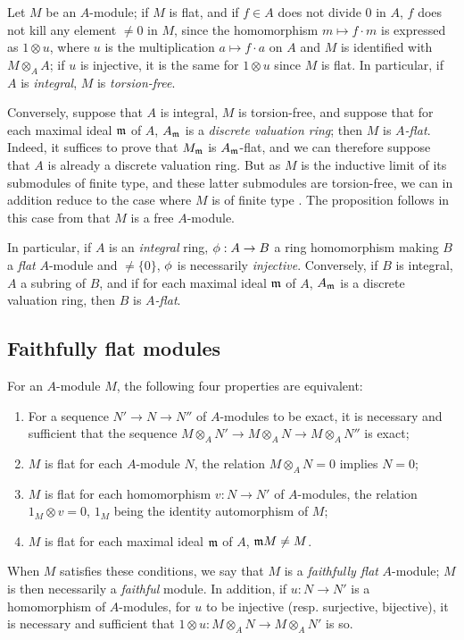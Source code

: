 \begin{env}[6.3.4]
\label{0.6.3.4}
Let $M$ be an $A$-module; if $M$ is flat, and if $f\in A$ does not divide $0$ in $A$, $f$
does not kill any element $\neq 0$ in $M$, since the homomorphism $m\mapsto f\cdot m$ is
expressed as $1\otimes u$, where $u$ is the multiplication $a\mapsto f\cdot a$ on $A$ and
$M$ is identified with $M\otimes_A A$; if $u$ is injective, it is the same for $1\otimes u$
since $M$ is flat. In particular, if $A$ is {\em integral}, $M$ is {\em torsion-free}.

Conversely, suppose that $A$ is integral, $M$ is torsion-free, and suppose that for each
maximal ideal $\mathfrak{m}$ of $A$, $A_\mathfrak{m}$ is a {\em discrete valuation ring};
then $M$ is {\em $A$-flat}. Indeed, it suffices  to prove that
$M_\mathfrak{m}$ is $A_\mathfrak{m}$-flat, and we can therefore suppose that $A$ is already
a discrete valuation ring. But as $M$ is the inductive limit of its submodules of finite
type, and these latter submodules are torsion-free, we can in addition reduce to the case
where $M$ is of finite type . The proposition follows in this
case from that $M$ is a free $A$-module.

In particular, if $A$ is an {\em integral} ring, $\phi:A\to B$ a ring homomorphism making
$B$ a {\em flat} $A$-module and $\neq\{0\}$, $\phi$ is necessarily {\em injective}.
Conversely, if $B$ is integral, $A$ a subring of $B$, and if for each maximal ideal
$\mathfrak{m}$ of $A$, $A_\mathfrak{m}$ is a discrete valuation ring, then $B$ is
{\em $A$-flat}.
\end{env}

\subsection{Faithfully flat modules}
\label{subsection-faithfully-flat-modules}

\begin{env}[6.4.1]
\label{0.6.4.1}
For an $A$-module $M$, the following four properties are equivalent:
\begin{enumerate}[label=(\alph*)]
  \item For a sequence $N'\to N\to N''$ of $A$-modules to be exact, it is necessary and
    sufficient that the sequence $M\otimes_A N'\to M\otimes_A N\to M\otimes_A N''$ is exact;
  \item $M$ is flat for each $A$-module $N$, the relation $M\otimes_A N=0$ implies $N=0$;
  \item $M$ is flat for each homomorphism $v:N\to N'$ of $A$-modules, the relation
    $1_M\otimes v=0$, $1_M$ being the identity automorphism of $M$;
  \item $M$ is flat for each maximal ideal $\mathfrak{m}$ of $A$, $\mathfrak{m}M\neq M$.
\end{enumerate}

When $M$ satisfies these conditions, we say that $M$ is a {\em faithfully flat} $A$-module;
$M$ is then necessarily a {\em faithful} module. In addition, if $u:N\to N'$ is a
homomorphism of $A$-modules, for $u$ to be injective (resp. surjective, bijective), it is
necessary and sufficient that $1\otimes u:M\otimes_A N\to M\otimes_A N'$ is so.
\end{env}

